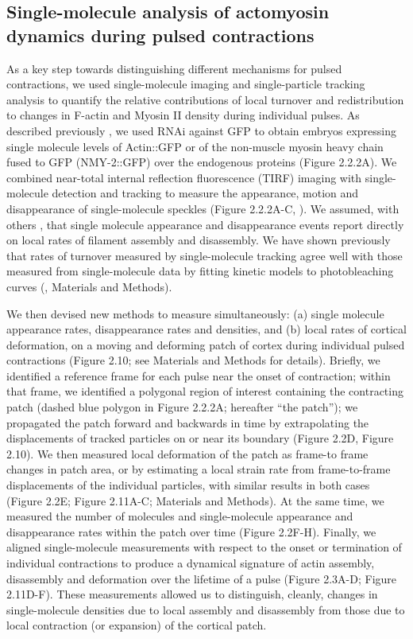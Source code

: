 \documentclass{ucetd}
\begin{document}
\subsection{Single-molecule analysis of actomyosin dynamics during pulsed contractions}
As a key step towards distinguishing different mechanisms for pulsed contractions, we used single-molecule imaging and single-particle tracking analysis to quantify the relative contributions of local turnover and redistribution to changes in F-actin and Myosin II density during individual pulses. As described previously \cite{Robin:2014jf}, we used RNAi against GFP to obtain embryos expressing single molecule levels of Actin::GFP or of the non-muscle myosin heavy chain fused to GFP (NMY-2::GFP) over the endogenous proteins (Figure 2.2.2A). We combined near-total internal reflection fluorescence (TIRF) imaging with single-molecule detection and tracking to measure the appearance, motion and disappearance of single-molecule speckles (Figure 2.2.2A-C, \cite{Robin:2014jf}). We assumed, with others \cite{Watanabe:2002jb, Vallotton:2004kz}, that single molecule appearance and disappearance events report directly on local rates of filament assembly and disassembly.  We have shown previously that rates of turnover measured by single-molecule tracking agree well with those measured from single-molecule data by fitting kinetic models to photobleaching curves  (\cite{Robin:2014jf}, Materials and Methods).

We then devised new methods to measure simultaneously: (a) single molecule appearance rates, disappearance rates and densities, and (b) local rates of cortical deformation, on a moving and deforming patch of cortex during individual pulsed contractions (Figure 2.10; see Materials and Methods for details). Briefly, we identified a reference frame for each pulse near the onset of contraction; within that frame, we identified a polygonal region of interest containing the contracting patch (dashed blue polygon in Figure 2.2.2A; hereafter “the patch”); we propagated the patch forward and backwards in time by extrapolating the displacements of tracked particles on or near its boundary (Figure 2.2D, Figure 2.10).   We then measured local deformation of the patch as frame-to frame changes in patch area, or by estimating a local strain rate from frame-to-frame displacements of the individual particles, with similar results in both cases (Figure 2.2E; Figure 2.11A-C; Materials and Methods).  At the same time, we measured the number of molecules and single-molecule appearance and disappearance rates within the patch over time (Figure 2.2F-H). Finally, we aligned single-molecule measurements with respect to the onset or termination of individual contractions to produce a dynamical signature of actin assembly, disassembly and deformation over the lifetime of a pulse (Figure 2.3A-D; Figure 2.11D-F). These measurements allowed us to distinguish, cleanly, changes in single-molecule densities due to local assembly and disassembly from those due to local contraction (or expansion) of the cortical patch.
\end{document}
